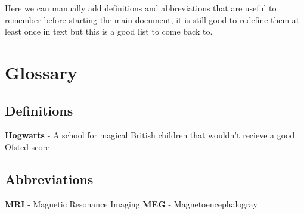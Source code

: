 \documentclass[../main.tex]{subfiles}
\begin{document}
Here we can manually add definitions and abbreviations that are useful to remember before starting the main document, it is still good to redefine them at least once in text but this is a good list to come back to.

\section*{Glossary}

\subsection*{Definitions}
\textbf{Hogwarts} - A school for magical British children that wouldn't recieve a good Ofsted score

\subsection*{Abbreviations}
\textbf{MRI} - Magnetic Resonance Imaging
\textbf{MEG} - Magnetoencephalogray 
\end{document}
